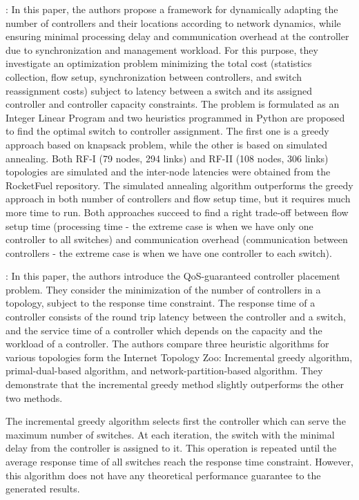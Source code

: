 \documentclass[a4paper,10pt]{article}
\begin{document}
\cite{BaRo13}: In this paper, the authors propose a framework for dynamically adapting the number of controllers and their locations according to network dynamics, while ensuring minimal processing delay and communication overhead at the controller due to synchronization and management workload. For this purpose, they investigate an optimization problem minimizing the total cost (statistics collection, flow setup, synchronization between controllers, and switch reassignment costs) subject to latency between a switch and its assigned controller and controller capacity constraints. The problem is formulated as an Integer Linear Program and two heuristics programmed in Python are proposed to find the optimal switch to controller assignment. The first one is a greedy approach based on knapsack problem, while the other is based on simulated annealing.  Both RF-I  (79 nodes, 294 links) and RF-II (108 nodes, 306 links) topologies are simulated and the inter-node latencies were obtained from the RocketFuel repository. The simulated annealing algorithm outperforms the greedy approach in both number of controllers and flow setup time, but it requires much more time to run. Both approaches succeed to find a right trade-off between flow setup time (processing time - the extreme case is when we have only one controller to all switches) and communication overhead (communication between controllers - the extreme case is when we have one controller to each switch). 


\cite{ChWa15}: In this paper, the authors introduce the QoS-guaranteed controller placement problem. They consider the minimization of the number of controllers in a topology, subject to the response time constraint. The response time of a controller consists of the round trip latency between the controller and a switch, and the service time of a controller which depends on the capacity and the workload of a controller. The authors compare three heuristic algorithms for various topologies form the Internet Topology Zoo: Incremental greedy algorithm, primal-dual-based algorithm, and network-partition-based algorithm. They demonstrate that the incremental greedy method slightly outperforms the other two methods.

The incremental greedy algorithm selects first the controller which can serve the maximum number of switches. At each iteration, the switch with the minimal delay from the controller is assigned to it. This operation is repeated until the average response time of all switches reach the response time constraint. However, this algorithm does not have any theoretical performance guarantee to the generated results. 
\end{document}
